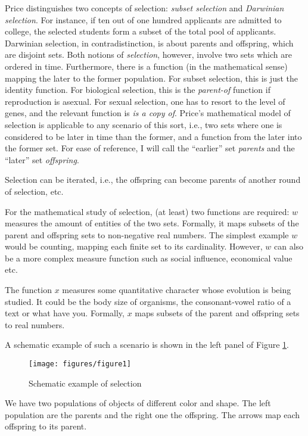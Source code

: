 \documentclass[output=paper,hidelinks]{langscibook}
\begin{document}
Price distinguishes two concepts of selection: \emph{subset selection} and \emph{Darwinian
  selection}. For instance, if ten out of one hundred applicants are admitted to college,
the selected students form a subset of the total pool of applicants. Darwinian selection,
in contradistinction, is about parents and offspring, which are disjoint sets. Both
notions of \emph{selection}, however, involve two sets which are ordered in
time. Furthermore, there is a function (in the mathematical sense) mapping the later to
the former population. For subset selection, this is just the identity function. For
biological selection, this is the \emph{parent-of} function if reproduction is
asexual. For sexual selection, one has to resort to the level of genes, and the relevant
function is \emph{is a copy of}. Price's mathematical model of selection is applicable to
any scenario of this sort, i.e., two sets where one is considered to be later in time than
the former, and a function from the later into the former set. For ease of reference, I
will call the ``earlier'' set \emph{parents} and the ``later'' set \emph{offspring}.

Selection can be iterated, i.e., the offspring can become parents of another round of
selection, etc.

For the mathematical study of selection, (at least) two functions are
required: $w$ measures the amount of entities of the two sets. Formally, it maps subsets
of the parent and offspring sets to non-negative real numbers. The simplest example $w$
would be counting, mapping each finite set to its cardinality. However, $w$ can also be a
more complex measure function such as social influence, economical value etc.

The function $x$ measures some quantitative character whose evolution is being studied. It
could be the body size of organisms, the consonant-vowel ratio of a text or what have
you. Formally, $x$ maps subsets of the parent and offspring sets to real numbers.

A schematic example of such a scenario is shown in the left panel of Figure \ref{fig:1}.
\begin{figure}
  \centering
  \texttt{[image: figures/figure1]}
  \caption{Schematic example of selection}
  \label{fig:1}
\end{figure}

We have two populations of objects of different color and shape. The left population are
the parents and the right one the offspring. The arrows map each offspring to its parent.
\end{document}
